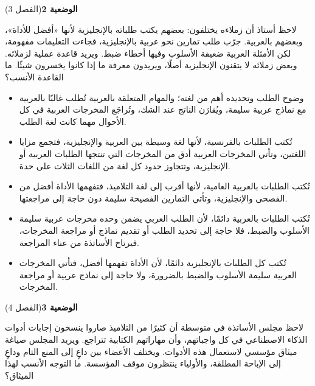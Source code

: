 \documentclass[11pt,a4paper]{article}
\begin{document}
\par\vspace{6pt}
\noindent
{\large\khatt\textbf{الوضعية 2}}\hfill{\small(الفصل 3)}\par\nopagebreak\vspace{3pt}
\setlength{\fboxsep}{7pt}\colorbox{gray!10}{\parbox{\dimexpr\linewidth-14pt}{لاحظ أستاذ أن زملاءه يختلفون: بعضهم يكتب طلباته بالإنجليزية لأنها «أفضل للأداة»، وبعضهم بالعربية. جرّب طلب تمارين نحو عربية بالإنجليزية، فجاءت التعليمات مفهومة، لكن الأمثلة العربية ضعيفة الأسلوب وفيها أخطاء ضبط. ويريد قاعدة عملية لزملائه. وبعض زملائه لا يتقنون الإنجليزية أصلًا، ويريدون معرفة ما إذا كانوا يخسرون شيئًا. ما القاعدة الأنسب؟}}\par\nopagebreak
\begin{itemize}[leftmargin=1.0cm, labelsep=6pt, itemsep=3pt, topsep=4pt, parsep=0pt]
  \item[\textbf{أ)}] وضوح الطلب وتحديده أهم من لغته؛ والمهام المتعلقة بالعربية تُطلب غالبًا بالعربية مع نماذج عربية سليمة، ويُقارَن الناتج عند الشك، وتُراجَع المخرجات العربية في كل الأحوال مهما كانت لغة الطلب.
  \item[\textbf{ب)}] تُكتب الطلبات بالفرنسية، لأنها لغة وسيطة بين العربية والإنجليزية، فتجمع مزايا اللغتين، وتأتي المخرجات العربية أدق من المخرجات التي تنتجها الطلبات العربية أو الإنجليزية، وتتجاوز حدود كل لغة من اللغات الثلاث على حدة.
  \item[\textbf{ج)}] تُكتب الطلبات بالعربية العامية، لأنها أقرب إلى لغة التلاميذ، فتفهمها الأداة أفضل من الفصحى والإنجليزية، وتأتي التمارين الفصيحة سليمة دون حاجة إلى مراجعتها.
  \item[\textbf{د)}] تُكتب الطلبات بالعربية دائمًا، لأن الطلب العربي يضمن وحده مخرجات عربية سليمة الأسلوب والضبط، فلا حاجة إلى تحديد الطلب أو تقديم نماذج أو مراجعة المخرجات، فيرتاح الأساتذة من عناء المراجعة.
  \item[\textbf{هـ)}] تُكتب كل الطلبات بالإنجليزية دائمًا، لأن الأداة تفهمها أفضل، فتأتي المخرجات العربية سليمة الأسلوب والضبط بالضرورة، ولا حاجة إلى نماذج عربية أو مراجعة المخرجات.
\end{itemize}
\par\vspace{6pt}
\noindent
{\large\khatt\textbf{الوضعية 3}}\hfill{\small(الفصل 4)}\par\nopagebreak\vspace{3pt}
\setlength{\fboxsep}{7pt}\colorbox{gray!10}{\parbox{\dimexpr\linewidth-14pt}{لاحظ مجلس الأساتذة في متوسطة أن كثيرًا من التلاميذ صاروا ينسخون إجابات أدوات الذكاء الاصطناعي في كل واجباتهم، وأن مهاراتهم الكتابية تتراجع. ويريد المجلس صياغة ميثاق مؤسسي لاستعمال هذه الأدوات. ويختلف الأعضاء بين داعٍ إلى المنع التام وداعٍ إلى الإباحة المطلقة، والأولياء ينتظرون موقف المؤسسة. ما التوجه الأنسب لهذا الميثاق؟}}\par\nopagebreak
\end{document}
